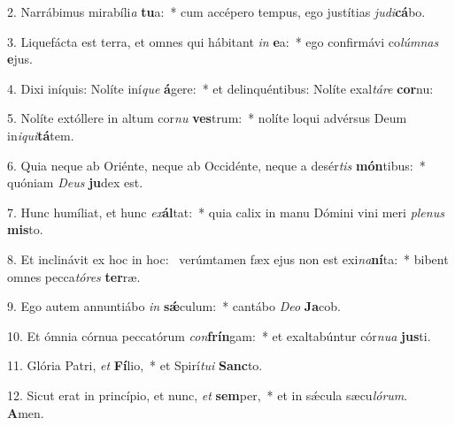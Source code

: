 2. Narrábimus mirabíli\textit{a} \textbf{tu}a:~*  cum accépero tempus, ego justítias \textit{ju}\textit{di}\textbf{cá}bo.\

3. Liquefácta est terra, et omnes qui hábitant \textit{in} \textbf{e}a:~*  ego confirmávi co\textit{lúm}\textit{nas} \textbf{e}jus.\

4. Dixi iníquis: Nolíte iní\textit{que} \textbf{á}gere:~*  et delinquéntibus: Nolíte exal\textit{tá}\textit{re} \textbf{cor}nu:\

5. Nolíte extóllere in altum cor\textit{nu} \textbf{ves}trum:~*  nolíte loqui advérsus Deum in\textit{i}\textit{qui}\textbf{tá}tem.\

6. Quia neque ab Oriénte, neque ab Occidénte, neque a desér\textit{tis} \textbf{món}tibus:~*  quóniam \textit{De}\textit{us} \textbf{ju}dex est.\

7. Hunc humíliat, et hunc \textit{ex}\textbf{ál}tat:~*  quia calix in manu Dómini vini meri \textit{ple}\textit{nus} \textbf{mis}to.\

8. Et inclinávit ex hoc in hoc: \dag\  verúmtamen fæx ejus non est exi\textit{na}\textbf{ní}ta:~*  bibent omnes pecca\textit{tó}\textit{res} \textbf{ter}ræ.\

9. Ego autem annuntiábo \textit{in} \textbf{sǽ}culum:~*  cantábo \textit{De}\textit{o} \textbf{Ja}cob.\

10. Et ómnia córnua peccatórum \textit{con}\textbf{frín}gam:~*  et exaltabúntur cór\textit{nu}\textit{a} \textbf{jus}ti.\

11. Glória Patri, \textit{et} \textbf{Fí}lio,~*  et Spirí\textit{tu}\textit{i} \textbf{Sanc}to.\

12. Sicut erat in princípio, et nunc, \textit{et} \textbf{sem}per,~*  et in sǽcula sæcu\textit{ló}\textit{rum}. \textbf{A}men.\

